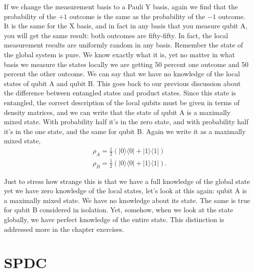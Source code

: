 
If we change the measurement basis to a Pauli Y basis, again we find that the probability of the $+1$ outcome is the same as the probability of the $-1$ outcome. It is the same for the X basis, and in fact in any basis that you measure qubit A, you will get the same result: both outcomes are fifty-fifty. In fact, the local measurement results are uniformly random in any basis. Remember the state of the global system is pure. We know exactly what it is, yet no matter in what basis we measure the states locally we are getting 50 percent one outcome and 50 percent the other outcome. We can say that we have no knowledge of the local states of qubit A and qubit B. This goes back to our previous discussion about the difference between entangled states and product states.  Since this state is entangled, the correct description of the local qubits must be given in terms of density matrices, and we can write that the state of qubit A is a maximally mixed state. With probability half it's in the zero state, and with probability half it's in the one state, and the same for qubit B. Again we write it as a maximally mixed state,
\begin{equation}
\begin{aligned}
&\rho_A=\frac{1}{2}(|0\rangle\langle 0|+| 1\rangle\langle 1|) \\
&\rho_B=\frac{1}{2}(|0\rangle\langle 0|+| 1\rangle\langle 1|).
\end{aligned}
\end{equation}

Just to stress how strange this is that we have a full knowledge of the global state yet we have zero knowledge of the local states, let's look at this again: qubit A is a maximally mixed state. We have no knowledge about its state. The same is true for qubit B considered in isolation. Yet, somehow, when we look at the state globally, we have perfect knowledge of the entire state. This distinction is addressed more in the chapter exercises.


\section{SPDC}
\label{sec:4-4_spdc}


